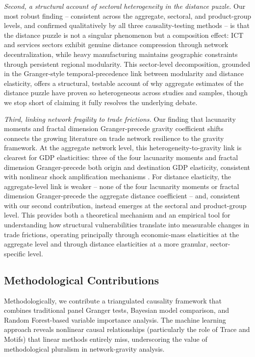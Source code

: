 \documentclass[preprint, 3p,
authoryear]{elsarticle} %
\begin{document}
\textit{Second, a structural account of sectoral heterogeneity in the distance puzzle.}
Our most robust finding -- consistent across the aggregate, sectoral,
and product-group levels, and confirmed qualitatively by all three
causality-testing methods -- is that the distance puzzle
\citep{disdier2008, brun2005, yotov2012distance} is not a singular
phenomenon but a composition effect: ICT and services sectors exhibit
genuine distance compression through network decentralization, while
heavy manufacturing maintains geographic constraints through persistent
regional modularity. This sector-level decomposition, grounded in the
Granger-style temporal-precedence link between modularity and distance
elasticity, offers a structural, testable account of why aggregate
estimates of the distance puzzle have proven so heterogeneous across
studies and samples, though we stop short of claiming it fully resolves
the underlying debate.

\textit{Third, linking network fragility to trade frictions.} Our
finding that lacunarity moments and fractal dimension Granger-precede
gravity coefficient shifts connects the growing literature on trade
network resilience \citep{bonadio2021, carvalho2021} to the gravity
framework. At the aggregate network level, this heterogeneity-to-gravity
link is clearest for GDP elasticities: three of the four lacunarity
moments and fractal dimension Granger-precede both origin and
destination GDP elasticity, consistent with nonlinear shock
amplification mechanisms \citep{baqaee2019macroeconomic}. For distance
elasticity, the aggregate-level link is weaker -- none of the four
lacunarity moments or fractal dimension Granger-precede the aggregate
distance coefficient -- and, consistent with our second contribution,
instead emerges at the sectoral and product-group level. This provides
both a theoretical mechanism and an empirical tool for understanding how
structural vulnerabilities translate into measurable changes in trade
frictions, operating principally through economic-mass elasticities at
the aggregate level and through distance elasticities at a more
granular, sector-specific level.

\subsection{Methodological
Contributions}\label{subsec:method_contributions}

Methodologically, we contribute a triangulated causality framework that
combines traditional panel Granger tests, Bayesian model comparison, and
Random Forest-based variable importance analysis. The machine learning
approach reveals nonlinear causal relationships (particularly the role
of Trace and Motifs) that linear methods entirely miss, underscoring the
value of methodological pluralism in network-gravity analysis.
\end{document}

